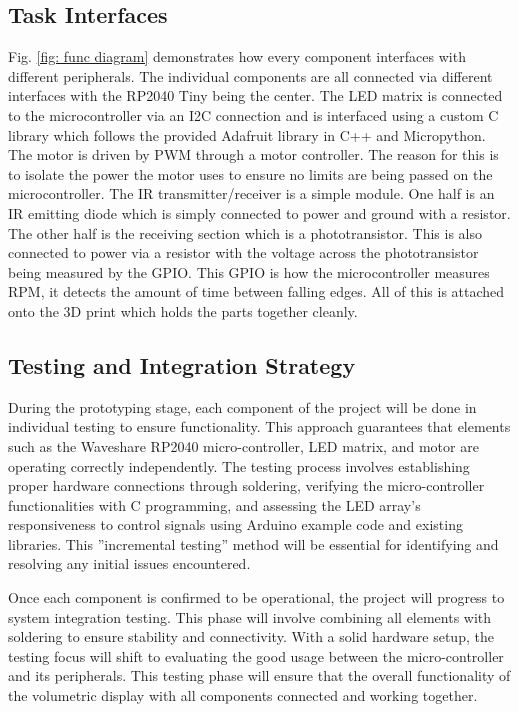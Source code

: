 \documentclass[11pt,journal]{IEEEtran}
\begin{document}
\subsection{Task Interfaces}

Fig. \ref{fig: func diagram} demonstrates how every component interfaces with different peripherals. The individual components are all connected via different interfaces with the RP2040 Tiny being the center. The LED matrix is connected to the microcontroller via an I2C connection and is interfaced using a custom C library which follows the provided Adafruit library in C++ and Micropython. The motor is driven by PWM through a motor controller. The reason for this is to isolate the power the motor uses to ensure no limits are being passed on the microcontroller. The IR transmitter/receiver is a simple module. One half is an IR emitting diode which is simply connected to power and ground with a resistor. The other half is the receiving section which is a phototransistor. This is also connected to power via a resistor with the voltage across the phototransistor being measured by the GPIO. This GPIO is how the microcontroller measures RPM, it detects the amount of time between falling edges. All of this is attached onto the 3D print which holds the parts together cleanly.

\subsection{Testing and Integration Strategy}
During the prototyping stage, each component of the project will be done in individual testing to ensure functionality. This approach guarantees that elements such as the Waveshare RP2040 micro-controller, LED matrix, and motor are operating correctly independently. The testing process involves establishing proper hardware connections through soldering, verifying the micro-controller functionalities with C programming, and assessing the LED array's responsiveness to control signals using Arduino  example code and existing libraries. This ''incremental testing'' method will be essential for identifying and resolving any initial issues encountered.

Once each component is confirmed to be operational, the project will progress to system integration testing. This phase will involve combining all elements with  soldering  to ensure stability and connectivity. With a solid hardware setup, the testing focus will shift to evaluating the good usage between the micro-controller and its peripherals. This testing phase will ensure that the overall functionality of the volumetric display with all components connected and working together.
\end{document}
